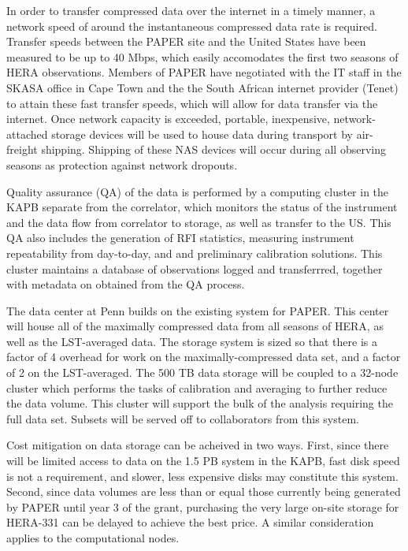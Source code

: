 \documentclass[preprint]{aastex}
\begin{document}
In order to transfer compressed data over the internet in a timely
manner, a network speed of around the instantaneous compressed data
rate is required. Transfer speeds between the PAPER site and the
United States have been measured to be up to 40 Mbps, which easily
accomodates the first two seasons of HERA observations. Members of
PAPER have negotiated with the IT staff in the SKASA office in Cape
Town and the the South African internet provider (Tenet) to attain
these fast transfer speeds, which will allow for data transfer via the
internet. Once network capacity is exceeded, portable, inexpensive,
network-attached storage devices will be used to house data during
transport by air-freight shipping. Shipping of these NAS devices will
occur during all observing seasons as protection against network
dropouts.

Quality assurance (QA) of the data is performed by a computing cluster
in the KAPB separate from the correlator, which monitors the status of
the instrument and the data flow from correlator to storage, as well
as transfer to the US.  This QA also includes the generation of RFI
statistics, measuring instrument repeatability from day-to-day, and
and preliminary calibration solutions.  This cluster maintains a
database of observations logged and transferrred, together with
metadata on obtained from the QA process.


The data center at Penn builds on the existing system for PAPER.  This
center will house all of the maximally compressed data from all
seasons of HERA, as well as the LST-averaged data.  The storage system
is sized so that there is a factor of 4 overhead for work on the
maximally-compressed data set, and a factor of 2 on the LST-averaged.
The 500 TB data storage will be coupled to a 32-node cluster which
performs the tasks of calibration and averaging to further reduce the
data volume.  This cluster will support the bulk of the analysis
requiring the full data set.  Subsets will be served off to
collaborators from this system.

Cost mitigation on data storage can be acheived in two ways. First,
since there will be limited access to data on the 1.5 PB system in the
KAPB, fast disk speed is not a requirement, and slower, less expensive
disks may constitute this system.  Second, since data volumes are less
than or equal those currently being generated by PAPER until year 3 of
the grant, purchasing the very large on-site storage for HERA-331 can
be delayed to achieve the best price.  A similar consideration applies
to the computational nodes.
\end{document}
